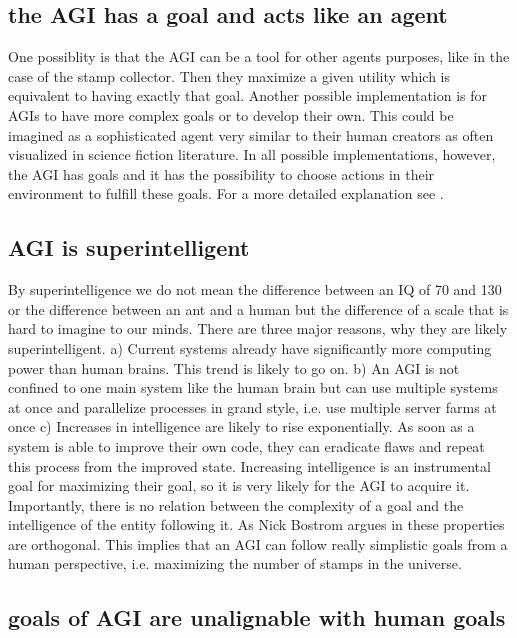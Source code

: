 \documentclass[conference]{IEEEtran}
\begin{document}
\subsection{the AGI has a goal and acts like an agent}
%
One possiblity is that the AGI can be a tool for other agents purposes, like in the case of the stamp collector. Then they maximize a given utility which is equivalent to having exactly that goal. Another possible implementation is for AGIs to have more complex goals or to develop their own. This could be imagined as a sophisticated agent very similar to their human creators as often visualized in science fiction literature. In all possible implementations, however, the AGI has goals and it has the possibility to choose actions in their environment to fulfill these goals. For a more detailed explanation see \cite{IntelligenceMiles2018}.

\subsection{AGI is superintelligent}

By superintelligence we do not mean the difference between an IQ of 70 and 130 or the difference between an ant and a human but the difference of a scale that is hard to imagine to our minds. There are three major reasons, why they are likely superintelligent. a) Current systems already have significantly more computing power than human brains. This trend is likely to go on. b) An AGI is not confined to one main system like the human brain but can use multiple systems at once and parallelize processes in grand style, i.e. use multiple server farms at once c) Increases in intelligence are likely to rise exponentially. As soon as a system is able to improve their own code, they can eradicate flaws and repeat this process from the improved state. Increasing intelligence is an instrumental goal for maximizing their goal, so it is very likely for the AGI to acquire it. Importantly, there is no relation between the complexity of a goal and the intelligence of the entity following it. As Nick Bostrom argues in \cite{OrthoginalityThesisBostrom2012} these properties are orthogonal. This implies that an AGI can follow really simplistic goals from a human perspective, i.e. maximizing the number of stamps in the universe.

\subsection{goals of AGI are unalignable with human goals}
\end{document}

